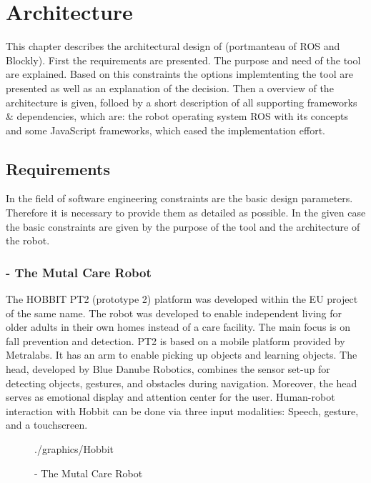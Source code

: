 \chapter{Architecture}
This chapter describes the architectural design of \toolname{} (portmanteau of ROS and Blockly). First the requirements are presented. The purpose and need of the tool are explained. Based on this constraints the options implemtenting the tool are presented as well as an explanation of the decision. Then a overview of the architecture is given, folloed by a short description of all supporting frameworks & dependencies, which are: the robot operating system ROS with its concepts and some JavaScript frameworks, which eased the implementation effort.

\section{Requirements} \label{sec:requirements}
In the field of software engineering constraints are the basic design parameters. Therefore it is necessary to provide them as detailed as possible. In the given case the basic constraints are given by the purpose of the tool and the architecture of the robot.

\subsection{\hobbit{} - The Mutal Care Robot}
The HOBBIT PT2 (prototype 2) platform was developed within the EU project of the same name. The robot was developed to enable independent living for older adults in their own homes instead of a care facility. The main focus is on fall prevention and detection. PT2 is based on a mobile platform provided by Metralabs. It has an arm to enable picking up objects and learning objects. The head, developed by Blue Danube Robotics, combines the sensor set-up for detecting objects, gestures, and obstacles during navigation. Moreover, the head serves as emotional display and attention center for the user. Human-robot interaction with Hobbit can be done via three input modalities: Speech, gesture, and a touchscreen. \cite{HobbitACIN}\\

\begin{figure}[htbp]
	\centering
	\begin{overpic}[width=0.3\linewidth]{./graphics/Hobbit}
	\end{overpic}
	\caption{\hobbit{} - The Mutal Care Robot}%
	\label{fig:HobbitPic}%
\end{figure}

